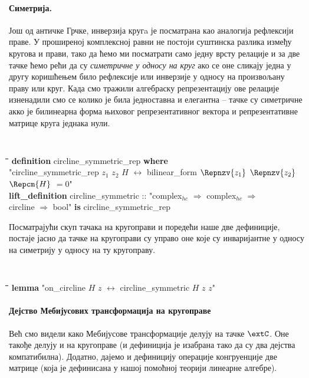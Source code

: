 \paragraph{Симетрија.}
Још од античке Грчке, инверзија кругa је посматрана као аналогија
рефлексији праве. У проширеној комплексној равни не постоји суштинска
разлика између кругова и прави, тако да ћемо ми посматрати само једну
врсту релације и за две тачке ћемо рећи да су \emph{симетричне у
  односу на круг} ако се оне сликају једна у другу коришћењем било
рефлексије или инверзије у односу на произвољану праву или круг. Када
смо тражили алгебраску репрезентацију ове релације изненадили смо се
колико је била једноставна и елегантна -- тачке су симетричне акко је
билинеарна форма њиховог репрезентативног вектора и репрезентативне
матрице круга једнака нули.
{\tt
\begin{tabbing}
\hspace{5mm}\=\hspace{5mm}\=\hspace{5mm}\=\hspace{5mm}\=\hspace{5mm}\=\kill
{\bf definition} circline\_symmetric\_rep {\bf where}\\
\>"circline\_symmetric\_rep $z_1$ $z_2$ $H$ $\longleftrightarrow$ bilinear\_form $\Repnzv{z_1}$ $\Repnzv{z_2}$ $\Repcm{H}$ $= 0$"\\
{\bf lift\_definition} circline\_symmetric :: "complex$_{hc}$ $\Rightarrow$ complex$_{hc}$ $\Rightarrow$ \\
\>circline $\Rightarrow$ bool" {\bf is} circline\_symmetric\_rep
\end{tabbing}
}

Посматрајући скуп тачака на кругоправи и поредећи наше две дефиниције,
постаје јасно да тачке на кругоправи су управо оне које су
инваријантне у односу на симетрију у односу на ту кругоправу.
{\tt
\begin{tabbing}
\hspace{5mm}\=\hspace{5mm}\=\hspace{5mm}\=\hspace{5mm}\=\hspace{5mm}\=\kill
{\bf lemma} "on\_circline $H$ $z$ $\longleftrightarrow$ circline\_symmetric $H$ $z$ $z$"
\end{tabbing}
}

\paragraph{Дејство Мебијусових трансформација на кругоправе}
Већ смо видели како Мебијусове трансформације делују на тачке $\extC$.
Оне такође делују и на кругоправе (и дефиниција је изабрана тако да су
два дејства компатибилна). Додатно, дајемо и дефиницију операције
конгруенције две матрице (која је дефинисана у нашој помоћној теорији
линеарне алгебре).

